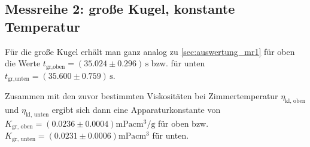 \subsection{Messreihe 2: große Kugel, konstante Temperatur}

Für die große Kugel erhält man ganz analog zu \ref{sec:auswertung_mr1} für oben die Werte $t_{\text{gr,oben}} = \left(35.024 \pm 0.296\right) \, \unit{\s}$ 
bzw. für unten $t_{\text{gr,unten}} = \left(35.600 \pm 0.759\right) \, \unit{\s}$.

Zusammen mit den zuvor bestimmten Viskositäten bei Zimmertemperatur $\eta_{\text{kl, oben}}$ und $\eta_{\text{kl, unten}}$ ergibt sich dann eine Apparaturkonstante von
$K_{\text{gr, oben}} = \left(0.0236 \pm 0.0004 \right) \unit{\milli\Pa \cubic\cm\per\g}$ für oben bzw.
$K_{\text{gr, unten}} = \left(0.0231 \pm 0.0006 \right) \unit{\milli\Pa \cubic\cm}$ für unten.


